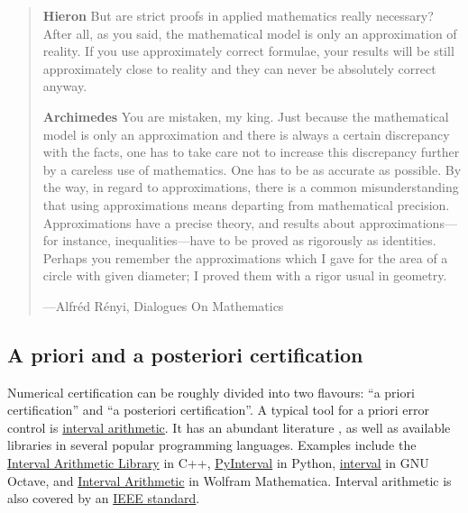 \documentclass{article}
\theoremstyle{definition}
\begin{document}
\begin{quote}
{\bf Hieron} But are strict proofs in applied mathematics really necessary? After all, as you said, the mathematical model is only an approximation of reality. If you use approximately correct formulae, your results will be still approximately close to reality and they can never be absolutely correct anyway.

{\bf Archimedes} You are mistaken, my king. Just because the mathematical model is only an approximation and there is always a certain discrepancy with the facts, one has to take care not to increase this discrepancy further by a careless use of mathematics. One has to be as accurate as possible. By the way, in regard to approximations, there is a common misunderstanding that using approximations means departing from mathematical precision. Approximations have a precise theory, and results about approximations—for instance, inequalities—have to be proved as rigorously as identities. Perhaps you remember the approximations which I gave for the area of a circle with given diameter; I proved them with a rigor usual in geometry.

  \begin{flushright}
    {---Alfréd Rényi, Dialogues On Mathematics \cite{book:RenyiDialogs,book:RenyiDialogusok}}
  \end{flushright}
\end{quote}

\subsection{A priori and a posteriori certification} 

Numerical certification can be roughly divided into two flavours: ``a priori certification'' and ``a posteriori certification''. A typical tool for a priori error control is \href{https://en.wikipedia.org/wiki/Interval_arithmetic}{interval arithmetic}. It has an abundant literature \cite{book:IntervalMoore2009,book:IntervalNeumaier1991,book:IntervalTucker2011}, as well as available libraries in several popular programming languages. Examples include the \href{https://www.boost.org/doc/libs/latest/libs/numeric/interval/doc/interval.htm}{Interval Arithmetic Library} in C++, \href{https://pyinterval.readthedocs.io/en/latest/}{PyInterval} in Python, \href{https://octave.sourceforge.io/interval/}{interval} in GNU Octave, and \href{https://reference.wolfram.com/language/guide/IntervalArithmetic.html}{Interval Arithmetic} in Wolfram Mathematica. 
Interval arithmetic is also covered by an \href{https://standards.ieee.org/ieee/1788/4431/}{IEEE standard}.
\end{document}
